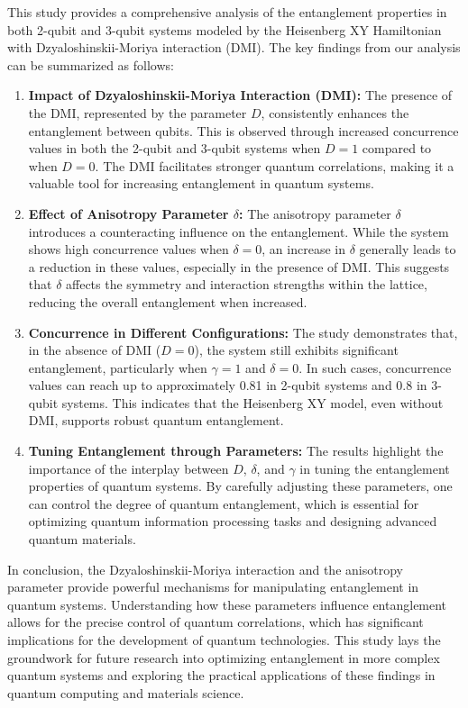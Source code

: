 This study provides a comprehensive analysis of the entanglement properties in both 2-qubit and 3-qubit systems modeled by the Heisenberg XY Hamiltonian with Dzyaloshinskii-Moriya interaction (DMI). The key findings from our analysis can be summarized as follows:

\begin{enumerate}
    \item \textbf{Impact of Dzyaloshinskii-Moriya Interaction (DMI):}
    The presence of the DMI, represented by the parameter \(D\), consistently enhances the entanglement between qubits. This is observed through increased concurrence values in both the 2-qubit and 3-qubit systems when \(D = 1\) compared to when \(D = 0\). The DMI facilitates stronger quantum correlations, making it a valuable tool for increasing entanglement in quantum systems.

    \item \textbf{Effect of Anisotropy Parameter \(\delta\):}
    The anisotropy parameter \(\delta\) introduces a counteracting influence on the entanglement. While the system shows high concurrence values when \(\delta = 0\), an increase in \(\delta\) generally leads to a reduction in these values, especially in the presence of DMI. This suggests that \(\delta\) affects the symmetry and interaction strengths within the lattice, reducing the overall entanglement when increased.

    \item \textbf{Concurrence in Different Configurations:}
    The study demonstrates that, in the absence of DMI (\(D = 0\)), the system still exhibits significant entanglement, particularly when \(\gamma = 1\) and \(\delta = 0\). In such cases, concurrence values can reach up to approximately 0.81 in 2-qubit systems and 0.8 in 3-qubit systems. This indicates that the Heisenberg XY model, even without DMI, supports robust quantum entanglement.

    \item \textbf{Tuning Entanglement through Parameters:}
    The results highlight the importance of the interplay between \(D\), \(\delta\), and \(\gamma\) in tuning the entanglement properties of quantum systems. By carefully adjusting these parameters, one can control the degree of quantum entanglement, which is essential for optimizing quantum information processing tasks and designing advanced quantum materials.
\end{enumerate}

In conclusion, the Dzyaloshinskii-Moriya interaction and the anisotropy parameter provide powerful mechanisms for manipulating entanglement in quantum systems. Understanding how these parameters influence entanglement allows for the precise control of quantum correlations, which has significant implications for the development of quantum technologies. This study lays the groundwork for future research into optimizing entanglement in more complex quantum systems and exploring the practical applications of these findings in quantum computing and materials science.